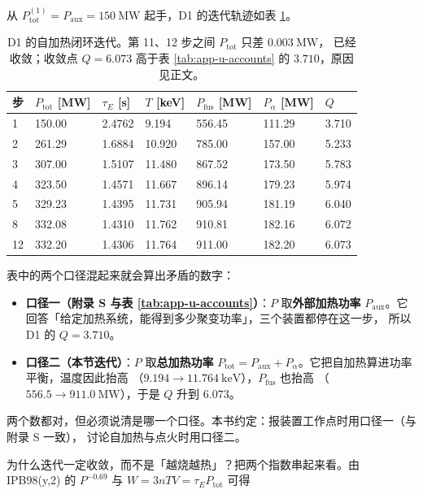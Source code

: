 从 $P_{\mathrm{tot}}^{(1)}=P_{\mathrm{aux}}=150\ \mathrm{MW}$ 起手，D1 的迭代轨迹如表
\ref{tab:app-u-iter}。

\begin{table}[htbp]
\centering
\small
\caption{D1 的自加热闭环迭代。第 11、12 步之间 $P_{\mathrm{tot}}$ 只差 $0.003\ \mathrm{MW}$，
已经收敛；收敛点 $Q=6.073$ 高于表 \ref{tab:app-u-accounts} 的 $3.710$，原因见正文。}
\label{tab:app-u-iter}
\begin{tabular}{@{}p{1.2cm}p{2.0cm}p{1.9cm}p{1.7cm}p{2.0cm}p{1.8cm}p{1.5cm}@{}}
\toprule
步 & $P_{\mathrm{tot}}$ [MW] & $\tau_E$ [s] & $T$ [keV] & $P_{\mathrm{fus}}$ [MW] & $P_\alpha$ [MW] & $Q$ \\
\midrule
1  & 150.00 & 2.4762 & 9.194  & 556.45 & 111.29 & 3.710 \\
2  & 261.29 & 1.6884 & 10.920 & 785.00 & 157.00 & 5.233 \\
3  & 307.00 & 1.5107 & 11.480 & 867.52 & 173.50 & 5.783 \\
4  & 323.50 & 1.4571 & 11.667 & 896.14 & 179.23 & 5.974 \\
5  & 329.23 & 1.4395 & 11.731 & 905.94 & 181.19 & 6.040 \\
8  & 332.08 & 1.4310 & 11.762 & 910.81 & 182.16 & 6.072 \\
12 & 332.20 & 1.4306 & 11.764 & 911.00 & 182.20 & 6.073 \\
\bottomrule
\end{tabular}

\end{table}

表中的两个口径混起来就会算出矛盾的数字：
\begin{itemize}
  \item \textbf{口径一（附录 S 与表 \ref{tab:app-u-accounts}）}：$P$ 取\textbf{外部加热功率}
        $P_{\mathrm{aux}}$。它回答「给定加热系统，能得到多少聚变功率」，三个装置都停在这一步，
        所以 D1 的 $Q=3.710$。
  \item \textbf{口径二（本节迭代）}：$P$ 取\textbf{总加热功率}
        $P_{\mathrm{tot}}=P_{\mathrm{aux}}+P_\alpha$。它把自加热算进功率平衡，温度因此抬高
        （$9.194\to11.764\ \mathrm{keV}$），$P_{\mathrm{fus}}$ 也抬高
        （$556.5\to911.0\ \mathrm{MW}$），于是 $Q$ 升到 $6.073$。
\end{itemize}
两个数都对，但必须说清是哪一个口径。本书约定：报装置工作点时用口径一（与附录 S 一致），
讨论自加热与点火时用口径二。

为什么迭代一定收敛，而不是「越烧越热」？把两个指数串起来看。由 IPB98(y,2) 的
$P^{-0.69}$ 与 $W=3nTV=\tau_E P_{\mathrm{tot}}$ 可得


